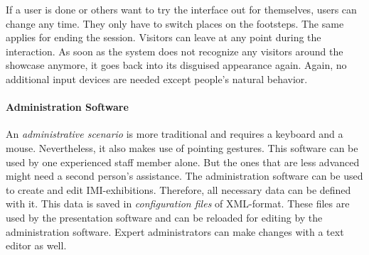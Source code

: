 If a user is done or others want to try the interface out for themselves, users can change any time. They only have to switch places on the footsteps. The same applies for ending the session. Visitors can leave at any point during the interaction. As soon as the system does not recognize any visitors around the showcase anymore, it goes back into its disguised appearance again. Again, no additional input devices are needed except people's natural behavior.

\paragraph{Administration Software} An \textit{administrative scenario} is more traditional and requires a keyboard and a mouse. Nevertheless, it also makes use of pointing gestures. This software can be used by one experienced staff member alone. But the ones that are less advanced might need a second person's assistance. The administration software can be used to create and edit \ac{IMI}-exhibitions. Therefore, all necessary data can be defined with it. This data is saved in \textit{configuration files} of XML-format. These files are used by the presentation software and can be reloaded for editing by the administration software. Expert administrators can make changes with a text editor as well. 
\\
